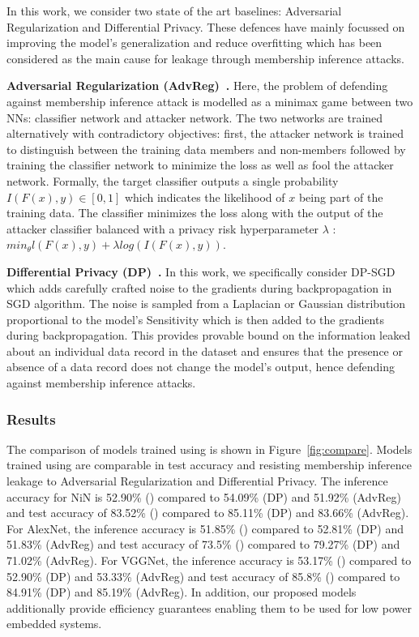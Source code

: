 In this work, we consider two state of the art baselines: Adversarial Regularization and Differential Privacy.
These defences have mainly focussed on improving the model's generalization and reduce overfitting which has been considered as the main cause for leakage through membership inference attacks.

\noindent\textbf{Adversarial Regularization (AdvReg)~\cite{DBLP:conf/ccs/NasrSH18}.} Here, the problem of defending against membership inference attack is modelled as a minimax game between two NNs: classifier network and attacker network.
The two networks are trained alternatively with contradictory objectives: first, the attacker network is trained to distinguish between the training data members and non-members followed by training the classifier network to minimize the loss as well as fool the attacker network.
Formally, the target classifier outputs a single probability $I(F(x),y) \in [0,1]$ which indicates the likelihood of $x$ being part of the training data.
The classifier minimizes the loss along with the output of the attacker classifier balanced with a privacy risk hyperparameter $\lambda$ : $min_{\theta} l(F(x),y) + \lambda log(I(F(x),y))$.

\noindent\textbf{Differential Privacy (DP)~\cite{Abadi:2016:DLD:2976749.2978318}.} In this work, we specifically consider DP-SGD which adds carefully crafted noise to the gradients during backpropagation in SGD algorithm.
The noise is sampled from a Laplacian or Gaussian distribution proportional to the model's Sensitivity which is then added to the gradients during backpropagation.
This provides provable bound on the information leaked about an individual data record in the dataset and ensures that the presence or absence of a data record does not change the model's output, hence defending against membership inference attacks.


\subsubsection{Results}

The comparison of models trained using \method\hspace{0.02in} is shown in Figure~\ref{fig:compare}.
Models trained using \method\hspace{0.02in} are comparable in test accuracy and resisting membership inference leakage to Adversarial Regularization and Differential Privacy.
The inference accuracy for NiN is 52.90\% (\method) compared to 54.09\% (DP) and 51.92\% (AdvReg) and test accuracy of 83.52\% (\method) compared to 85.11\% (DP) and 83.66\% (AdvReg).
For AlexNet, the inference accuracy is 51.85\% (\method) compared to 52.81\% (DP) and 51.83\% (AdvReg) and test accuracy of 73.5\% (\method) compared to 79.27\% (DP) and 71.02\% (AdvReg).
For VGGNet, the inference accuracy is 53.17\% (\method) compared to 52.90\% (DP) and 53.33\% (AdvReg) and test accuracy of 85.8\% (\method) compared to 84.91\% (DP) and 85.19\% (AdvReg).
In addition, our proposed models additionally provide efficiency guarantees enabling them to be used for low power embedded systems.

